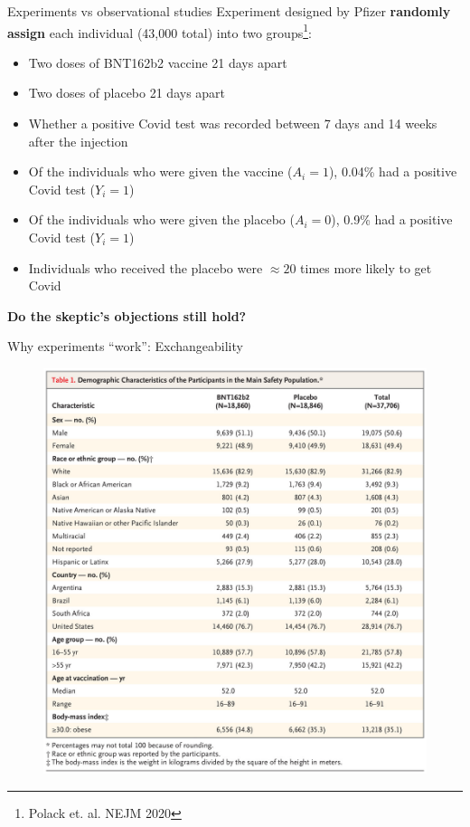 \documentclass{beamer}
\begin{document}
\begin{frame}{Experiments vs observational studies}
Experiment designed by Pfizer \textbf{randomly assign} each individual (43,000 total) into two groups\footnote{Polack et. al. NEJM 2020}:
\begin{itemize}
        \item Two doses of BNT162b2 vaccine 21 days apart
        \item Two doses of placebo 21 days apart
        \item Whether a positive Covid test was recorded between 7 days and 14 weeks after the injection
\end{itemize}
\vspace{1em}

\pause
     \begin{itemize}
         \item Of the individuals who were given the vaccine ($A_i = 1$), 0.04\% had a positive Covid test ($Y_i = 1$)
         \item Of the individuals who were given the placebo ($A_i = 0$), 0.9\% had a positive Covid test ($Y_i = 1$)
         \item Individuals who received the placebo were $\approx 20$ times more likely to get Covid 
     \end{itemize}

\pause \vspace{1em}
\textbf{Do the skeptic's objections still hold?}

\end{frame}

\begin{frame}{Why experiments ``work'': Exchangeability}

\begin{figure}
    \centering
    \includegraphics[scale = .18]{figures/pfizer_balance.jpg}
\end{figure}

\end{frame}
\end{document}
